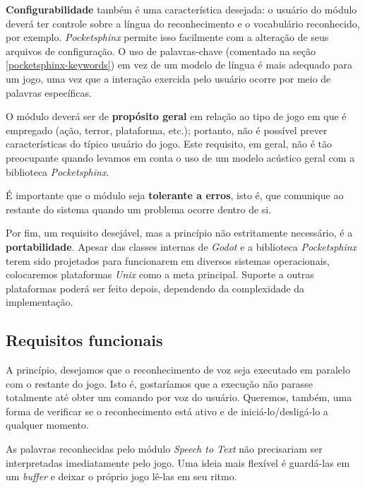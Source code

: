\textbf{Configurabilidade} também é uma característica desejada: o usuário do módulo deverá ter controle sobre a língua do reconhecimento e o vocabulário reconhecido, por exemplo. \textit{Pocketsphinx} permite isso facilmente com a alteração de seus arquivos de configuração. O uso de palavras-chave (comentado na seção \ref{pocketsphinx-keywords}) em vez de um modelo de língua é mais adequado para um jogo, uma vez que a interação exercida pelo usuário ocorre por meio de palavras específicas.

O módulo deverá ser de \textbf{propósito geral} em relação ao tipo de jogo em que é empregado (ação, terror, plataforma, etc.); portanto, não é possível prever características do típico usuário do jogo. Este requisito, em geral, não é tão preocupante quando levamos em conta o uso de um modelo acústico geral com a biblioteca \textit{Pocketsphinx}.

É importante que o módulo seja \textbf{tolerante a erros}, isto é, que comunique ao restante do sistema quando um problema ocorre dentro de si.

Por fim, um requisito desejável, mas a princípio não estritamente necessário, é a  \textbf{portabilidade}. Apesar das classes internas de \textit{Godot} e a biblioteca \textit{Pocketsphinx} terem sido projetados para funcionarem em diversos sistemas operacionais, colocaremos plataformas \textit{Unix} como a meta principal. Suporte a outras plataformas poderá ser feito depois, dependendo da complexidade da implementação.


\subsection{Requisitos funcionais}
\label{moduleFunctionalRequirements}

A princípio, desejamos que o reconhecimento de voz seja executado em paralelo com o restante do jogo. Isto é, gostaríamos que a execução não parasse totalmente até obter um comando por voz do usuário. Queremos, também, uma forma de verificar se o reconhecimento está ativo e de iniciá-lo/desligá-lo a qualquer momento.

As palavras reconhecidas pelo módulo \textit{Speech to Text} não precisariam ser interpretadas imediatamente pelo jogo. Uma ideia mais flexível é guardá-las em um \textit{buffer} e deixar o próprio jogo lê-las em seu ritmo.


